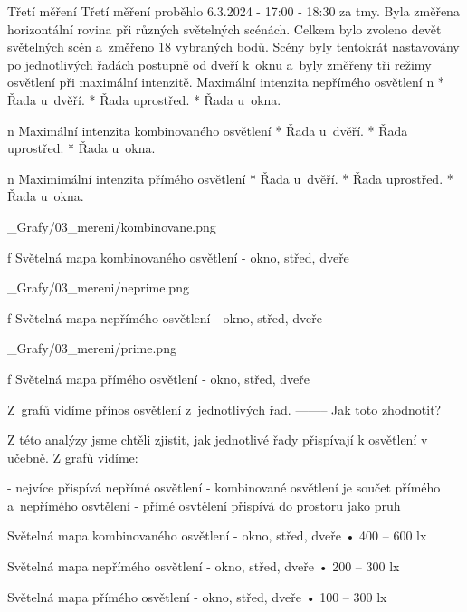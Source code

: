 \sec Třetí měření
Třetí měření proběhlo 6.3.2024 - 17:00 - 18:30 za tmy. Byla změřena horizontální rovina při různých světelných scénách.
Celkem bylo zvoleno devět světelných scén a~změřeno 18 vybraných bodů. Scény byly tentokrát nastavovány po jednotlivých
řadách postupně od dveří k~oknu a~byly změřeny tři režimy osvětlení při maximální intenzitě.
\medskip
{\sbf Maximální intenzita nepřímého osvětlení}
\medskip
\begitems \style n
    * Řada u~dvěří.
    * Řada uprostřed.
    * Řada u~okna.
\enditems

\medskip
\begitems \style n
{\sbf Maximální intenzita kombinovaného osvětlení}
\medskip
    * Řada u~dvěří.
    * Řada uprostřed.
    * Řada u~okna.
\enditems
\medskip

\begitems \style n
{\sbf Maximimální intenzita přímého osvětlení}
\medskip
    * Řada u~dvěří.
    * Řada uprostřed.
    * Řada u~okna.
\enditems

\medskip {}
\picw=18cm _Grafy/03_mereni/kombinovane.png
\caption/f Světelná mapa kombinovaného osvětlení - okno, střed, dveře
\medskip

\medskip {}
\picw=18cm _Grafy/03_mereni/neprime.png
\caption/f Světelná mapa nepřímého osvětlení - okno, střed, dveře
\medskip

\medskip {}
\picw=18cm _Grafy/03_mereni/prime.png
\caption/f Světelná mapa přímého osvětlení - okno, střed, dveře
\medskip

Z~grafů vidíme přínos osvětlení z~jednotlivých řad. -------- Jak toto zhodnotit?

\medskip
Z této analýzy jsme chtěli zjistit, jak jednotlivé řady přispívají k osvětlení v učebně. Z grafů vidíme:

- nejvíce přispívá nepřímé osvětlení
- kombinované osvětlení je součet přímého a~nepřímého osvtělení
- přímé osvtělení přispívá do prostoru jako pruh

Světelná mapa kombinovaného osvětlení - okno, střed, dveře
    • 400 – 600 lx

Světelná mapa nepřímého osvětlení - okno, střed, dveře
    • 200 – 300 lx

Světelná mapa přímého osvětlení - okno, střed, dveře
    • 100 – 300 lx